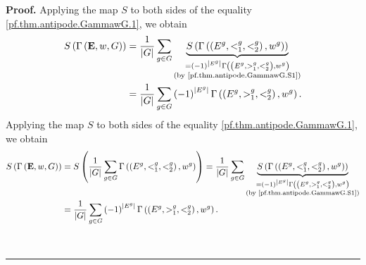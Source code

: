 \documentclass[numbers=enddot,12pt,final,onecolumn,notitlepage,abstracton]{scrartcl}
\theoremstyle{definition}
\newenvironment{proof}[1][Proof]{\noindent\textbf{#1.} }{\ \rule{0.5em}{0.5em}}
\let\sumnonlimits\sum
\renewcommand{\sum}{\sumnonlimits\limits}
\newenvironment{verlong}{}{}
\newenvironment{vershort}{}{}
\newcommand{\EE}{{\mathbf{E}}}
\begin{document}
\begin{proof}
\begin{vershort}
Applying the map $S$ to both sides of the equality
\eqref{pf.thm.antipode.GammawG.1}, we obtain
\begin{align}
S\left(  \Gamma\left(  { \EE },w,G\right)  \right)
& = \dfrac{1}{
\left\vert G\right\vert }\sum_{g\in G}\underbrace{S\left(  \Gamma\left(
\left(  E^{g},<_{1}^{g},<_{2}^{g}\right)  ,w^{g}\right)  \right)
}_{\substack{=\left(  -1\right)  ^{\left\vert E^{g}\right\vert }\Gamma\left(
\left(  E^{g},>_{1}^{g},<_{2}^{g}\right)  ,w^{g}\right)  \\\text{(by
\eqref{pf.thm.antipode.GammawG.S1})}}}\nonumber\\
& =\dfrac{1}{\left\vert G\right\vert }\sum_{g\in G}\left(  -1\right)
^{\left\vert E^{g}\right\vert }
\Gamma\left(  \left(  E^{g},>_{1}^{g},<_{2}^{g}\right)  ,w^{g}\right)
.
\label{pf.thm.antipode.GammawG.1S}
\end{align}
\end{vershort}
\begin{verlong}
Applying the map $S$ to both sides of the equality
\eqref{pf.thm.antipode.GammawG.1}, we obtain
\begin{align}
S\left(  \Gamma\left(  { \EE },w,G\right)  \right)
& = S \left( \dfrac{1}{
\left\vert G\right\vert }\sum_{g\in G} \Gamma\left(
\left(  E^{g},<_{1}^{g},<_{2}^{g}\right)  ,w^{g}\right)
\right)
= \dfrac{1}{
\left\vert G\right\vert }\sum_{g\in G}\underbrace{S\left(  \Gamma\left(
\left(  E^{g},<_{1}^{g},<_{2}^{g}\right)  ,w^{g}\right)  \right)
}_{\substack{=\left(  -1\right)  ^{\left\vert E^{g}\right\vert }\Gamma\left(
\left(  E^{g},>_{1}^{g},<_{2}^{g}\right)  ,w^{g}\right)  \\\text{(by
\eqref{pf.thm.antipode.GammawG.S1})}}}\nonumber\\
& =\dfrac{1}{\left\vert G\right\vert }\sum_{g\in G}\left(  -1\right)
^{\left\vert E^{g}\right\vert }
\Gamma\left(  \left(  E^{g},>_{1}^{g},<_{2}^{g}\right)  ,w^{g}\right)
.
\label{pf.thm.antipode.GammawG.1S}
\end{align}
\end{verlong}


\end{proof}
\end{document}
